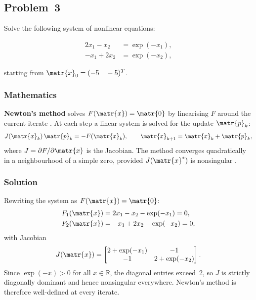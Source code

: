 \subsection{Problem~3}%
\label{problem:3}

Solve the following system of nonlinear equations:

\begin{align*}
  2x_1 - x_2 &= \exp(-x_1), \\
  -x_1 + 2x_2 &= \exp(-x_2),
\end{align*}

starting from $\matr{x}_0 = (-5 \quad -5)^T$.

\subsubsection*{Mathematics}

\textbf{Newton's method} solves $F(\matr{x}) = \matr{0}$ by linearising $F$
around the current iterate \citep{NoceWrig99}.  At each step a linear system is
solved for the update $\matr{p}_k$:
\begin{equation*}
  J(\matr{x}_k)\,\matr{p}_k = -F(\matr{x}_k),
  \qquad
  \matr{x}_{k+1} = \matr{x}_k + \matr{p}_k,
\end{equation*}
where $J = \partial F / \partial \matr{x}$ is the Jacobian.  The method converges
quadratically in a neighbourhood of a simple zero, provided $J(\matr{x}^*)$ is
nonsingular \citep{NoceWrig99}.

\subsubsection*{Solution}

Rewriting the system as $F(\matr{x}) = \matr{0}$:
\begin{align*}
  F_1(\matr{x}) &= 2x_1 - x_2 - \exp(-x_1) = 0, \\
  F_2(\matr{x}) &= -x_1 + 2x_2 - \exp(-x_2) = 0,
\end{align*}
with Jacobian
\begin{equation*}
  J(\matr{x}) =
  \begin{bmatrix}
    2 + \exp(-x_1) & -1 \\
    -1             & 2 + \exp(-x_2)
  \end{bmatrix}.
\end{equation*}
Since $\exp(-x) > 0$ for all $x \in \mathbb{R}$, the diagonal entries exceed~2,
so $J$ is strictly diagonally dominant and hence nonsingular everywhere.  Newton's
method is therefore well-defined at every iterate.


